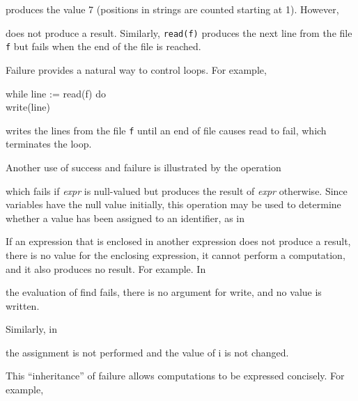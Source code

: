 
\noindent
produces the value 7 (positions in strings are counted starting at 1). However,


\noindent
does not produce a result. Similarly, \texttt{read(f)} produces the next
line from the file \texttt{f} but fails when the end of the file
is reached.

Failure provides a natural way to control loops. For example,

\begin{iconcode}
\>  while line := read(f) do\\
\> \>  write(line)
\end{iconcode}

\noindent
writes the lines from the file \texttt{f} until an end of file causes
read to fail, which terminates the loop.

Another use of success and failure is illustrated by the operation


\noindent
which fails if \textit{expr} is null-valued but produces the result of
\textit{expr} otherwise. Since variables have the null value
initially, this operation may be used to determine whether a value has
been assigned to an identifier, as in


If an expression that is enclosed in another expression does not
produce a result, there is no value for the enclosing expression, it
cannot perform a computation, and it also produces no result. For
example. In


\noindent the evaluation of find fails, there is no argument for
write, and no value is written.

Similarly, in


\noindent the assignment is not performed and the value of i is not changed.

This ``inheritance'' of failure allows computations to be expressed
concisely. For example,



